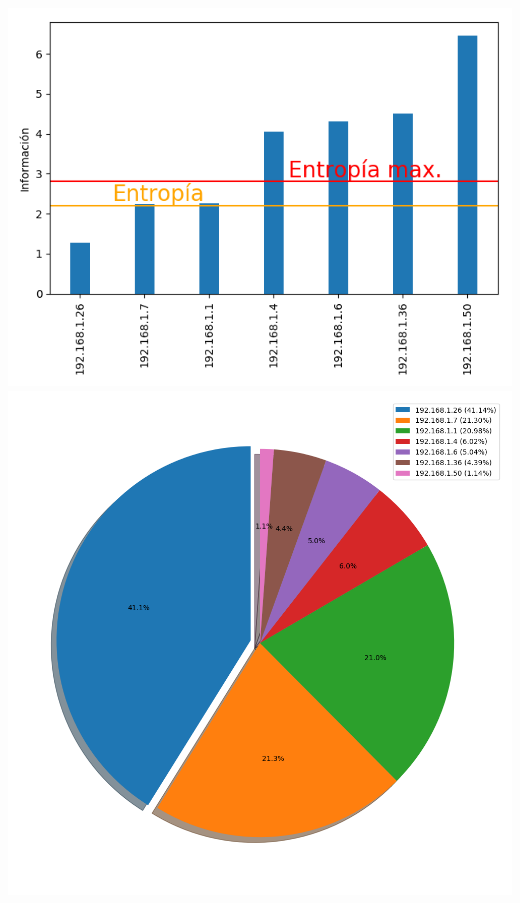 \hspace*{-1.5cm}
 \includegraphics[scale=0.6]{../plots/mauro_s2_informacion.png}
 \includegraphics[scale=0.4]{../plots/mauro_s2_probabilidades.png}

